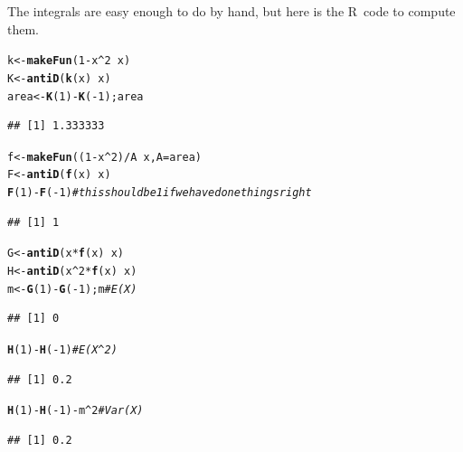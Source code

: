 \documentclass[twoside]{book}\usepackage[]{graphicx}\usepackage[]{xcolor}
\makeatletter
\newcommand{\hlnum}[1]{\textcolor[rgb]{0.686,0.059,0.569}{#1}}%
\newcommand{\hlcom}[1]{\textcolor[rgb]{0.678,0.584,0.686}{\textit{#1}}}%
\newcommand{\hlopt}[1]{\textcolor[rgb]{0,0,0}{#1}}%
\newcommand{\hlstd}[1]{\textcolor[rgb]{0.345,0.345,0.345}{#1}}%
\newcommand{\hlkwb}[1]{\textcolor[rgb]{0.69,0.353,0.396}{#1}}%
\newcommand{\hlkwc}[1]{\textcolor[rgb]{0.333,0.667,0.333}{#1}}%
\newcommand{\hlkwd}[1]{\textcolor[rgb]{0.737,0.353,0.396}{\textbf{#1}}}%
\newenvironment{kframe}{%
 \def\at@end@of@kframe{}%
 \ifinner\ifhmode%
  \def\at@end@of@kframe{\end{minipage}}%
  \begin{minipage}{\columnwidth}%
 \fi\fi%
 \def\FrameCommand##1{\hskip\@totalleftmargin \hskip-\fboxsep
 \colorbox{shadecolor}{##1}\hskip-\fboxsep
     \hskip-\linewidth \hskip-\@totalleftmargin \hskip\columnwidth}%
 \MakeFramed {\advance\hsize-\width
   \@totalleftmargin\z@ \linewidth\hsize
   \@setminipage}}%
 {\par\unskip\endMakeFramed%
 \at@end@of@kframe}
\newenvironment{knitrout}{}{} %
\def\R{{\sf R}}
\makeatother
\begin{document}
\begin{solution}
	The integrals are easy enough to do by hand, but here is the \R\ code 
	to compute them.
\begin{knitrout}
\color{fgcolor}\begin{kframe}
\begin{alltt}
\hlstd{k} \hlkwb{<-} \hlkwd{makeFun}\hlstd{(} \hlnum{1} \hlopt{-} \hlstd{x}\hlopt{^}\hlnum{2} \hlopt{~} \hlstd{x )}
\hlstd{K} \hlkwb{<-} \hlkwd{antiD}\hlstd{(} \hlkwd{k}\hlstd{(x)} \hlopt{~} \hlstd{x )}
\hlstd{area} \hlkwb{<-} \hlkwd{K}\hlstd{(}\hlnum{1}\hlstd{)} \hlopt{-} \hlkwd{K}\hlstd{(}\hlopt{-}\hlnum{1}\hlstd{); area}
\end{alltt}
\begin{verbatim}
## [1] 1.333333
\end{verbatim}
\begin{alltt}
\hlstd{f} \hlkwb{<-} \hlkwd{makeFun}\hlstd{( (}\hlnum{1} \hlopt{-} \hlstd{x}\hlopt{^}\hlnum{2}\hlstd{)}\hlopt{/}\hlstd{A} \hlopt{~} \hlstd{x,} \hlkwc{A}\hlstd{=area )}
\hlstd{F} \hlkwb{<-} \hlkwd{antiD}\hlstd{(}\hlkwd{f}\hlstd{(x)} \hlopt{~} \hlstd{x)}
\hlkwd{F}\hlstd{(}\hlnum{1}\hlstd{)} \hlopt{-} \hlkwd{F}\hlstd{(}\hlopt{-}\hlnum{1}\hlstd{)}    \hlcom{# this should be 1 if we have done things right}
\end{alltt}
\begin{verbatim}
## [1] 1
\end{verbatim}
\begin{alltt}
\hlstd{G} \hlkwb{<-} \hlkwd{antiD}\hlstd{( x} \hlopt{*} \hlkwd{f}\hlstd{(x)} \hlopt{~} \hlstd{x )}
\hlstd{H} \hlkwb{<-} \hlkwd{antiD}\hlstd{( x}\hlopt{^}\hlnum{2} \hlopt{*} \hlkwd{f}\hlstd{(x)} \hlopt{~} \hlstd{x )}
\hlstd{m} \hlkwb{<-} \hlkwd{G}\hlstd{(}\hlnum{1}\hlstd{)} \hlopt{-} \hlkwd{G}\hlstd{(}\hlopt{-}\hlnum{1}\hlstd{); m}               \hlcom{# E(X)}
\end{alltt}
\begin{verbatim}
## [1] 0
\end{verbatim}
\begin{alltt}
\hlkwd{H}\hlstd{(}\hlnum{1}\hlstd{)} \hlopt{-} \hlkwd{H}\hlstd{(}\hlopt{-}\hlnum{1}\hlstd{)}                       \hlcom{# E(X^2)}
\end{alltt}
\begin{verbatim}
## [1] 0.2
\end{verbatim}
\begin{alltt}
\hlkwd{H}\hlstd{(}\hlnum{1}\hlstd{)} \hlopt{-} \hlkwd{H}\hlstd{(}\hlopt{-}\hlnum{1}\hlstd{)} \hlopt{-} \hlstd{m}\hlopt{^}\hlnum{2}                 \hlcom{# Var(X)}
\end{alltt}
\begin{verbatim}
## [1] 0.2
\end{verbatim}
\end{kframe}
\end{knitrout}
\end{solution}
\end{document}
